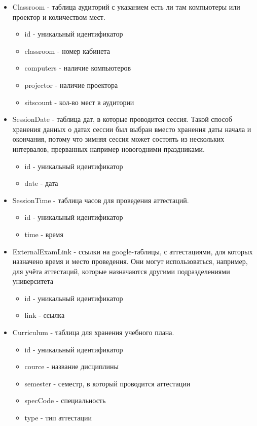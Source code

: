 \begin{itemize}
	\item Classroom - таблица аудиторий с указанием есть ли там компьютеры или проектор и количеством мест.
	\begin{itemize}
		\item id - уникальный идентификатор
		\item classroom - номер кабинета
		\item computers - наличие компьютеров
		\item projector - наличие проектора
		\item sitscount - кол-во мест в аудитории
	\end{itemize} 
	
	\item SessionDate - таблица дат, в которые проводится сессия. Такой способ хранения данных о датах сессии был выбран вместо хранения даты начала и окончания, потому что зимняя сессия может состоять из нескольких интервалов, прерванных например новогодними праздниками.
	\begin{itemize}
		\item id - уникальный идентификатор
		\item date - дата
	\end{itemize} 
	
	\item SessionTime - таблица часов для проведения аттестаций.
	\begin{itemize}
		\item id - уникальный идентификатор
		\item time - время
	\end{itemize} 	
	
	\item ExternalExamLink - ссылки на google-таблицы, с аттестациями, для которых назначено время и место проведения. Они могут использоваться, например, для учёта аттестаций, которые назначаются другими подразделениями университета
	\begin{itemize}
		\item id - уникальный идентификатор
		\item link - ссылка
	\end{itemize} 
	
	\item Curriculum - таблица для хранения учебного плана.
	\begin{itemize}
		\item id - уникальный идентификатор
		\item cource - название дисциплины
		\item semester - семестр, в который проводится аттестации
		\item specCode - специальность
		\item type - тип аттестации
	\end{itemize} 
	

\end{itemize}

